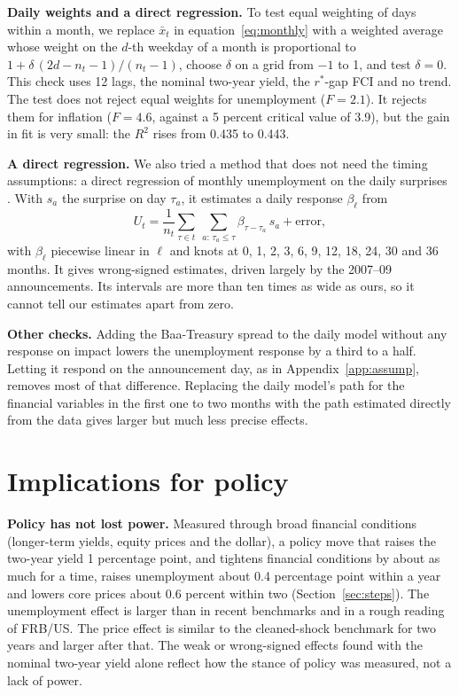 \documentclass[11pt]{article}
\newcommand{\rs}{r^{*}}
\begin{document}
\textbf{Daily weights and a direct regression.} To test equal weighting of days within a month, we replace $\bar x_t$ in equation~\eqref{eq:monthly} with a weighted average whose weight on the $d$-th weekday of a month is proportional to $1+\delta\,(2d-n_t-1)/(n_t-1)$, choose $\delta$ on a grid from $-1$ to 1, and test $\delta=0$. This check uses 12 lags, the nominal two-year yield, the $\rs$-gap FCI and no trend. The test does not reject equal weights for unemployment ($F=2.1$). It rejects them for inflation ($F=4.6$, against a 5 percent critical value of 3.9), but the gain in fit is very small: the $R^2$ rises from 0.435 to 0.443.

\textbf{A direct regression.} We also tried a method that does not need the timing assumptions: a direct regression of monthly unemployment on the daily surprises \citep{chudik2022,chudik2026}. With $s_a$ the surprise on day $\tau_a$, it estimates a daily response $\beta_\ell$ from
\begin{equation}
U_t = \frac{1}{n_t}\sum_{\tau\in t}\ \sum_{a:\,\tau_a\le\tau}\beta_{\tau-\tau_a}\, s_a + \text{error}, \label{eq:mfdl}
\end{equation}
with $\beta_\ell$ piecewise linear in $\ell$ and knots at 0, 1, 2, 3, 6, 9, 12, 18, 24, 30 and 36 months. It gives wrong-signed estimates, driven largely by the 2007--09 announcements. Its intervals are more than ten times as wide as ours, so it cannot tell our estimates apart from zero.

\textbf{Other checks.} Adding the Baa-Treasury spread to the daily model without any response on impact lowers the unemployment response by a third to a half. Letting it respond on the announcement day, as in Appendix~\ref{app:assump}, removes most of that difference. Replacing the daily model's path for the financial variables in the first one to two months with the path estimated directly from the data gives larger but much less precise effects.

\section{Implications for policy}\label{sec:policy}
\textbf{Policy has not lost power.} Measured through broad financial conditions (longer-term yields, equity prices and the dollar), a policy move that raises the two-year yield 1 percentage point, and tightens financial conditions by about as much for a time, raises unemployment about 0.4 percentage point within a year and lowers core prices about 0.6 percent within two (Section~\ref{sec:steps}). The unemployment effect is larger than in recent benchmarks and in a rough reading of FRB/US. The price effect is similar to the cleaned-shock benchmark for two years and larger after that. The weak or wrong-signed effects found with the nominal two-year yield alone reflect how the stance of policy was measured, not a lack of power.
\end{document}
